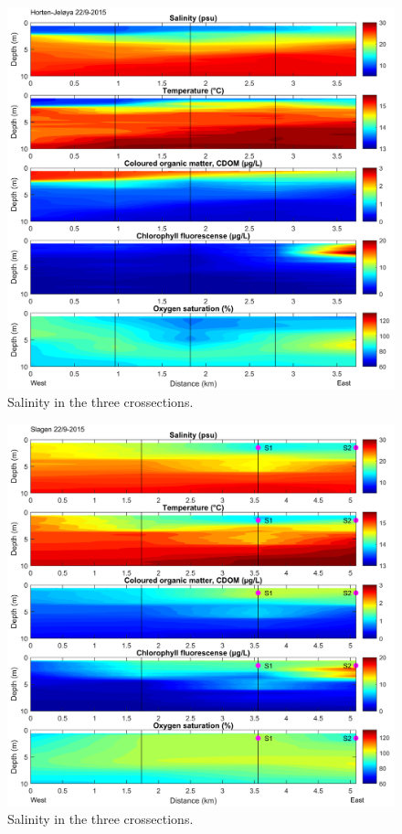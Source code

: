 \documentclass[12pt,a4paper,english]{article}
\begin{document}
\begin{figure}[ht]
\centerline{
\includegraphics*[width=\textwidth]{Figurer/Horten_22_09_2015_v2.png}}
\caption{\small
Salinity in the three crossections.}
\label{fig:horten}
\end{figure}

\begin{figure}[ht]
\centerline{
\includegraphics*[width=\textwidth]{Figurer/Slagen_22_09_2015_v2.png}}
\caption{\small
Salinity in the three crossections.}
\label{fig:slagen}
\end{figure}
\end{document}
